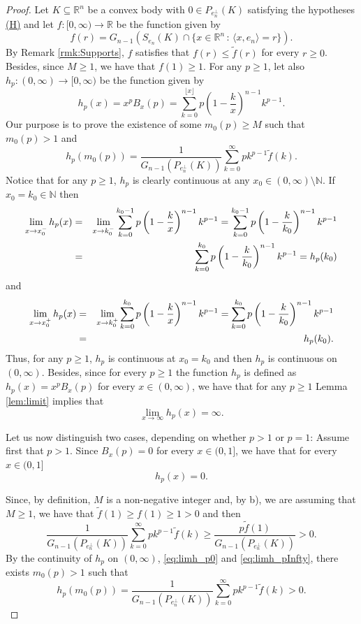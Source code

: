 \documentclass[10pt]{amsart}
\def\R{\mathbb{R}}
\def\N{\mathbb{N}}
\numberwithin{equation}{section}
\begin{document}
\begin{proof}
Let $K\subseteq\R^n$ be a convex body with $0\in P_{e_n^\perp}(K)$ satisfying the hypotheses \hyperlink{(H)}{(H)} and let  $f:[0,\infty)\to\R$ be the function given by
$$
f(r)=G_{n-1}(S_{e_n}(K)\cap\{x\in\R^n\,:\,\langle x,e_n\rangle=r\}).
$$
By Remark \ref{rmk:Supports}, $f$ satisfies that $f(r)\leq \tilde{f}(r)$ for every $r\geq0$. Besides, since $M\geq 1$, we have that $f(1)\geq 1$. For any $p\geq1$, let also $h_p:(0,\infty)\to[0,\infty)$ be the function given by
\begin{equation}\label{eq:Identityh_p}
h_p(x)=x^pB_x(p)=\sum_{k=0}^{\lfloor x\rfloor}p\left(1-\frac{k}{x}\right)^{n-1}k^{p-1}.
\end{equation}
Our purpose is to prove the existence of some $m_0(p)\geq M$ such that $m_0(p)>1$ and
$$
h_p(m_0(p))=\frac{1}{G_{n-1}(P_{e_n^\perp}(K))}\sum_{k=0}^\infty pk^{p-1}\tilde{f}(k).
$$
Notice that for any $p\geq 1$, $h_p$ is clearly continuous at any $x_0\in(0,\infty)\setminus\N$. If $x_0=k_0\in\N$ then
\begin{eqnarray*}
\lim_{x\to x_0^-}h_p(x)&=&\lim_{x\to k_0^-}\sum_{k=0}^{k_0-1}p\left(1-\frac{k}{x}\right)^{n-1}k^{p-1}=\sum_{k=0}^{k_0-1}p\left(1-\frac{k}{k_0}\right)^{n-1}k^{p-1}\cr
&=&\sum_{k=0}^{k_0}p\left(1-\frac{k}{k_0}\right)^{n-1}k^{p-1}=h_p(k_0)\cr
\end{eqnarray*}
and
\begin{eqnarray*}
\lim_{x\to x_0^+}h_p(x)&=&\lim_{x\to k_0^+}\sum_{k=0}^{k_0}p\left(1-\frac{k}{x}\right)^{n-1}k^{p-1}=\sum_{k=0}^{k_0}p\left(1-\frac{k}{k_0}\right)^{n-1}k^{p-1}\cr
&=&h_p(k_0).\cr
\end{eqnarray*}
Thus, for any $p\geq 1$, $h_p$ is continuous at $x_0=k_0$ and then $h_p$ is continuous on $(0,\infty)$. Besides, since for every  $p\geq1$ the function $h_p$ is defined as $h_p(x)=x^pB_x(p)$ for every $x\in(0,\infty)$, we have that for any $p\geq 1$ Lemma \ref{lem:limit} implies that
\begin{equation}\label{eq:limh_pInfty}
\lim_{x\to\infty}h_p(x)=\infty.
\end{equation}

Let us now distinguish two cases, depending on whether $p>1$ or $p=1$: Assume first that $p>1$. Since $B_x(p)=0$ for every $x\in(0,1]$,  we have that for every $x\in(0,1]$
\begin{equation}\label{eq:limh_p0}
h_p(x)=0.
\end{equation}

Since, by definition, $M$ is a non-negative integer and, by b), we are assuming that $M\geq1$, we have that $\tilde{f}(1)\geq f(1)\geq1>0$ and then
$$
\frac{1}{G_{n-1}(P_{e_n^\perp}(K))}\sum_{k=0}^{\infty}pk^{p-1}\tilde{f}(k)\geq\frac{p\tilde{f}(1)}{G_{n-1}(P_{e_n^\perp}(K))}>0.
$$
By the continuity of $h_p$ on $(0,\infty)$, \eqref{eq:limh_p0} and \eqref{eq:limh_pInfty}, there exists $m_0(p)>1$ such that
$$
h_p(m_0(p))=\frac{1}{G_{n-1}(P_{e_n^\perp}(K))}\sum_{k=0}^{\infty}pk^{p-1}\tilde{f}(k)>0.
$$



\end{proof}
\end{document}
